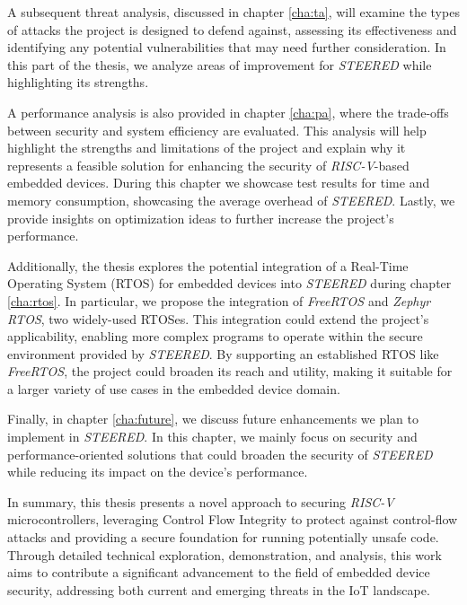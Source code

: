 A subsequent threat analysis, discussed in chapter \ref{cha:ta}, will examine
the types of attacks the project is designed to defend against, assessing its effectiveness
and identifying any potential vulnerabilities that may need further consideration.
In this part of the thesis, we analyze areas of improvement for \textit{STEERED}
while highlighting its strengths.

A performance analysis is also provided in chapter \ref{cha:pa}, where the trade-offs
between security and system efficiency are evaluated. This analysis will help
highlight the strengths and limitations of the project and explain why it
represents a feasible solution for enhancing the security of \textit{RISC-V}-based
embedded devices. During this chapter we showcase test results for time and
memory consumption, showcasing the average overhead of \textit{STEERED}. Lastly,
we provide insights on optimization ideas to further increase the project's
performance.

Additionally, the thesis explores the potential integration of a Real-Time Operating
System (RTOS) for embedded devices into \textit{STEERED} during chapter
\ref{cha:rtos}. In particular, we propose the integration of \textit{FreeRTOS} and
\textit{Zephyr RTOS}, two widely-used RTOSes. This integration could extend the
project's applicability, enabling more complex programs to operate within the secure
environment provided by \textit{STEERED}. By supporting an established RTOS like
\textit{FreeRTOS}, the project could broaden its reach and utility, making it
suitable for a larger variety of use cases in the embedded device domain.

Finally, in chapter \ref{cha:future}, we discuss future enhancements we plan to
implement in \textit{STEERED}. In this chapter, we mainly focus on security and performance-oriented
solutions that could broaden the security of \textit{STEERED} while reducing its
impact on the device's performance.

In summary, this thesis presents a novel approach to securing \textit{RISC-V}
microcontrollers, leveraging Control Flow Integrity to protect against control-flow
attacks and providing a secure foundation for running potentially unsafe code.
Through detailed technical exploration, demonstration, and analysis, this work aims
to contribute a significant advancement to the field of embedded device security,
addressing both current and emerging threats in the IoT landscape.
